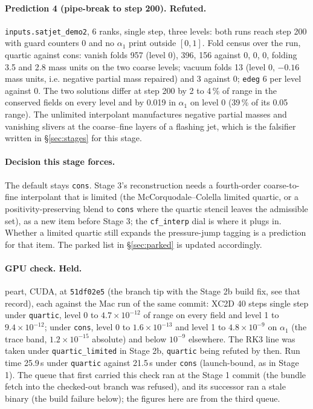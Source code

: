 \documentclass[11pt,a4paper]{article}
\newcommand{\code}[1]{\texttt{\small #1}}
\begin{document}
\paragraph{Prediction 4 (pipe-break to step 200).  Refuted.}
\code{inputs.satjet\_demo2}, 6 ranks, single step, three levels: both
runs reach step 200 with guard counters 0 and no $\alpha_1$ print outside
$[0,1]$.  Fold census over the run, quartic against cons: vanish folds
957 (level 0), 396, 156 against 0, 0, 0, folding 3.5 and 2.8 mass
units on the two coarse levels; vacuum folds 13 (level 0, $-0.16$ mass
units, i.e. negative partial mass repaired) and 3 against 0; \code{edeg}
6 per level against 0.  The two solutions differ at step 200 by 2 to
4\,\% of range in the conserved fields on every level and by 0.019 in
$\alpha_1$ on level 0 (39\,\% of its 0.05 range).  The unlimited
interpolant manufactures negative partial masses and vanishing slivers at
the coarse--fine layers of a flashing jet, which is the falsifier written
in \S\ref{sec:stages} for this stage.

\paragraph{Decision this stage forces.}  The default stays \code{cons}.
Stage 3's reconstruction needs a fourth-order coarse-to-fine interpolant
that is limited (the McCorquodale--Colella limited quartic, or a
positivity-preserving blend to \code{cons} where the quartic stencil
leaves the admissible set), as a new item before Stage 3; the
\code{cf\_interp} dial is where it plugs in.  Whether a limited quartic
still expands the pressure-jump tagging is a prediction for that item.
The parked list in \S\ref{sec:parked} is updated accordingly.

\paragraph{GPU check.  Held.}  peart, CUDA, at \code{51df02e5} (the
branch tip with the Stage 2b build fix, see that record), each against
the Mac run of the same commit: XC2D 40 steps single step under
\code{quartic}, level 0 to $4.7\times10^{-12}$ of range on every field
and level 1 to $9.4\times10^{-12}$; under \code{cons}, level 0 to
$1.6\times10^{-13}$ and level 1 to $4.8\times10^{-9}$ on $\alpha_1$
(the trace band, $1.2\times10^{-15}$ absolute) and below $10^{-9}$
elsewhere.  The RK3 line was taken under \code{quartic\_limited} in
Stage 2b, \code{quartic} being refuted by then.  Run time 25.9\,s under
\code{quartic} against 21.5\,s under \code{cons} (launch-bound, as in
Stage 1).  The queue that first carried this check ran at the Stage 1
commit (the bundle fetch into the checked-out branch was refused), and
its successor ran a stale binary (the build failure below); the figures
here are from the third queue.
\end{document}
